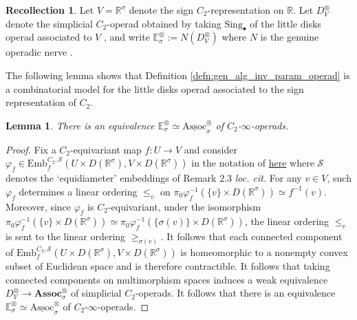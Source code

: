 \documentclass{article}
\newcommand{\RR}{\mathbb{R}}
\newcommand{\EE}{\mathbb{E}}
\newcommand{\Assoc}{\mathrm{Assoc}}
\newtheorem{lemma}[equation]{Lemma}
\theoremstyle{definition}
\newtheorem{recollection}[equation]{Recollection}
\begin{document}
\begin{recollection}
    Let $ V=\RR^\sigma $ denote the sign $ C_2 $-representation on $ \RR $. 
    Let $ D_V^\otimes $ denote the simplicial $ C_2 $-operad obtained by taking $ \mathrm{Sing}_\bullet $ of the little disks operad associated to $ V $ \cite[Definition 1.1]{GuillouMay}, and write $ \EE_\sigma^\otimes := N\left(D_V^\otimes\right) $ where $ N $ is the genuine operadic nerve \cites[\S4.1]{MR4011810}[Example 3.9.4]{Horev19}.
\end{recollection}
The following lemma shows that Definition \ref{defn:gen_alg_inv_param_operad} is a combinatorial model for the little disks operad associated to the sign representation of $ C_2 $. 
\begin{lemma}
    There is an equivalence $ \EE_\sigma^\otimes \simeq \underline{\Assoc}_\sigma^\otimes $ of $ C_2 $-$ \infty $-operads. 
\end{lemma}
\begin{proof} 
    Fix a $ C_2 $-equivariant map $ f \colon U \to V $ and consider $ \varphi_f \in \mathrm{Emb}^{C_2,\mathscr{S}}_f(U \times D(\RR^\sigma), V \times D(\RR^\sigma)) $ in the notation of \href{https://nataliesstewart.github.io/files/dunn.pdf}{here} where $ \mathscr{S} $ denotes the `equidiameter' embeddings of Remark 2.3 \emph{loc. cit.} 
    For any $ v \in V $, such $ \varphi_f $ determines a linear ordering $ \leq_v $ on $ \pi_0 \varphi_f^{-1}( \{v\} \times D(\RR^\sigma)) \simeq f^{-1}(v) $. 
    Moreover, since $ \varphi_f $ is $ C_2 $-equivariant, under the isomorphism $ \pi_0 \varphi_f^{-1}( \{v\} \times D(\RR^\sigma)) \simeq \pi_0 \varphi_f^{-1}( \{\sigma(v)\} \times D(\RR^\sigma)) $, the linear ordering $ \leq_v $ is sent to the linear ordering $ \geq_{\sigma(v)} $. 
    It follows that each connected component of $ \mathrm{Emb}^{C_2,\mathscr{S}}_f(U \times D(\RR^\sigma), V \times D(\RR^\sigma)) $ is homeomorphic to a nonempty convex subset of Euclidean space and is therefore contractible. 
    It follows that taking connected components on multimorphism spaces induces a weak equivalence $ D_V^\otimes \to \mathbf{Assoc}^\otimes_\sigma $ of simplicial $ C_2 $-operads. 
    It follows that there is an equivalence $ \EE_\sigma^\otimes \simeq \underline{\Assoc}_\sigma^\otimes $ of $ C_2 $-$ \infty $-operads. 
\end{proof}
\end{document}
